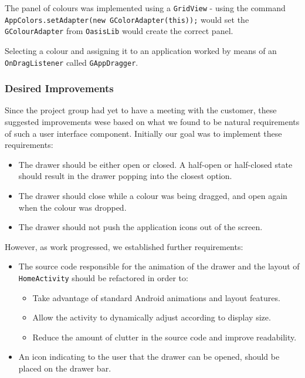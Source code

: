 The panel of colours was implemented using a \lstinline{GridView} - using the command \lstinline{AppColors.setAdapter(new GColorAdapter(this));} would set the \lstinline{GColourAdapter} from \lstinline{OasisLib} would create the correct panel.

Selecting a colour and assigning it to an application worked by means of an \lstinline{OnDragListener} called \lstinline{GAppDragger}.

\subsubsection{Desired Improvements}

Since the project group had yet to have a meeting with the customer, these suggested improvements wese based on what we found to be natural requirements of such a user interface component. Initially our goal was to implement these requirements:

\begin{itemize}
\item The drawer should be either open or closed. A half-open or half-closed state should result in the drawer popping into the closest option.
\item The drawer should close while a colour was being dragged, and open again when the colour was dropped.
\item The drawer should not push the application icons out of the screen.
\end{itemize}

However, as work progressed, we established further requirements:

\begin{itemize}
\item The source code responsible for the animation of the drawer and the layout of \lstinline{HomeActivity} should be refactored in order to:
\begin{itemize}
\item Take advantage of standard Android animations and layout features.
\item Allow the activity to dynamically adjust according to display size.
\item Reduce the amount of clutter in the source code and improve readability.
\end{itemize}
\item An icon indicating to the user that the drawer can be opened, should be placed on the drawer bar.
\end{itemize}

